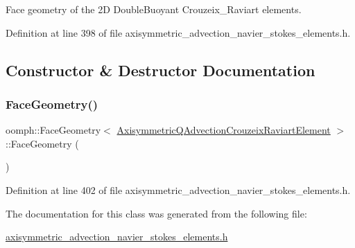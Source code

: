Face geometry of the 2D Double\+Buoyant Crouzeix\+\_\+\+Raviart elements. 

Definition at line 398 of file axisymmetric\+\_\+advection\+\_\+navier\+\_\+stokes\+\_\+elements.\+h.



\subsection{Constructor \& Destructor Documentation}
\mbox{\label{classoomph_1_1FaceGeometry_3_01AxisymmetricQAdvectionCrouzeixRaviartElement_01_4_a547500fddb8ee2861be4948339865e99}} 
\subsubsection{\texorpdfstring{Face\+Geometry()}{FaceGeometry()}}
{\footnotesize\ttfamily oomph\+::\+Face\+Geometry$<$ \hyperlink{classoomph_1_1AxisymmetricQAdvectionCrouzeixRaviartElement}{Axisymmetric\+Q\+Advection\+Crouzeix\+Raviart\+Element} $>$\+::Face\+Geometry (\begin{DoxyParamCaption}{ }\end{DoxyParamCaption})\hspace{0.3cm}{\ttfamily [inline]}}



Definition at line 402 of file axisymmetric\+\_\+advection\+\_\+navier\+\_\+stokes\+\_\+elements.\+h.



The documentation for this class was generated from the following file\+:\begin{DoxyCompactItemize}
\item 
\hyperlink{axisymmetric__advection__navier__stokes__elements_8h}{axisymmetric\+\_\+advection\+\_\+navier\+\_\+stokes\+\_\+elements.\+h}\end{DoxyCompactItemize}
